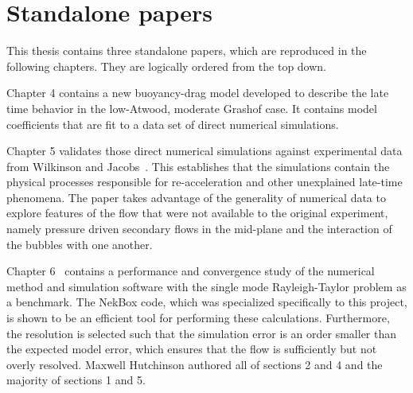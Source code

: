 \chapter{Standalone papers}

This thesis contains three standalone papers, which are reproduced in the following chapters.
They are logically ordered from the top down.

Chapter 4 contains a new buoyancy-drag model developed to describe the late time behavior in the low-Atwood, moderate Grashof case.
It contains model coefficients that are fit to a data set of direct numerical simulations.

Chapter 5 validates those direct numerical simulations against experimental data from Wilkinson and Jacobs~\cite{Wilkinson2007}.
This establishes that the simulations contain the physical processes responsible for re-acceleration and other unexplained late-time phenomena.
The paper takes advantage of the generality of numerical data to explore features of the flow that were not available to the original experiment, namely pressure driven secondary flows in the mid-plane and the interaction of the bubbles with one another.

Chapter 6~\cite{hutchinson2016efficiency} contains a performance and convergence study of the numerical method and simulation software with the single mode Rayleigh-Taylor problem as a benchmark.
The NekBox code, which was specialized specifically to this project, is shown to be an efficient tool for performing these calculations.
Furthermore, the resolution is selected such that the simulation error is an order smaller than the expected model error, which ensures that the flow is sufficiently but not overly resolved.
Maxwell Hutchinson authored all of sections 2 and 4 and the majority of sections 1 and 5.
